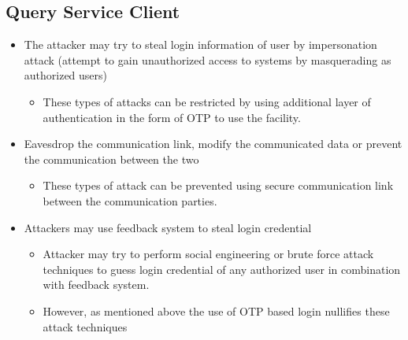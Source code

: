 \subsection{Query Service Client}
\begin{itemize}
    \item The attacker may try to steal login information of user by impersonation attack (attempt to gain unauthorized access to systems by masquerading as authorized users)
          \begin{itemize}
              \item These types of attacks can be restricted by using additional layer of authentication in the form of OTP to use the facility.
          \end{itemize}
    \item Eavesdrop the communication link, modify the communicated data or prevent the communication between the two
          \begin{itemize}
              \item These types of attack can be prevented using secure communication link between the communication parties.
          \end{itemize}
    \item Attackers may use feedback system to steal login credential
          \begin{itemize}
              \item Attacker may try to perform social engineering or brute force attack techniques to guess login credential of any authorized user in combination with feedback system.
              \item However, as mentioned above the use of OTP based login nullifies these attack techniques
          \end{itemize}
\end{itemize}

